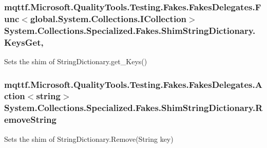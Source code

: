 \hypertarget{class_system_1_1_collections_1_1_specialized_1_1_fakes_1_1_shim_string_dictionary_a2ecfa05285a691c1959c7c2645bf2462}{
\subsubsection[{Keys\-Get}]{\setlength{\rightskip}{0pt plus 5cm}mqttf.\-Microsoft.\-Quality\-Tools.\-Testing.\-Fakes.\-Fakes\-Delegates.\-Func$<$global.\-System.\-Collections.\-I\-Collection$>$ System.\-Collections.\-Specialized.\-Fakes.\-Shim\-String\-Dictionary.\-Keys\-Get\hspace{0.3cm}{\ttfamily [get]}, {\ttfamily [set]}}}\label{class_system_1_1_collections_1_1_specialized_1_1_fakes_1_1_shim_string_dictionary_a2ecfa05285a691c1959c7c2645bf2462}


Sets the shim of String\-Dictionary.\-get\-\_\-\-Keys()

\hypertarget{class_system_1_1_collections_1_1_specialized_1_1_fakes_1_1_shim_string_dictionary_a0fe532f6be05876c3041c6698c81b85e}{
\subsubsection[{Remove\-String}]{\setlength{\rightskip}{0pt plus 5cm}mqttf.\-Microsoft.\-Quality\-Tools.\-Testing.\-Fakes.\-Fakes\-Delegates.\-Action$<$string$>$ System.\-Collections.\-Specialized.\-Fakes.\-Shim\-String\-Dictionary.\-Remove\-String\hspace{0.3cm}{\ttfamily [set]}}}\label{class_system_1_1_collections_1_1_specialized_1_1_fakes_1_1_shim_string_dictionary_a0fe532f6be05876c3041c6698c81b85e}


Sets the shim of String\-Dictionary.\-Remove(\-String key)


